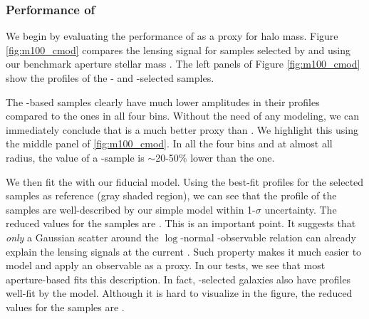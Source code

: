\documentclass[fleqn,usenatbib,useAMS,english]{mnras}
\begin{document}
\subsubsection{Performance of \mcmodel{}}
    \label{sec:cmodel}


    We begin by evaluating the performance of \cmodel{} as a proxy for halo mass.
    Figure \ref{fig:m100_cmod} compares the lensing signal for samples selected by \mcmodel{} and
    using our benchmark aperture stellar mass .
    The left panels of Figure \ref{fig:m100_cmod} show the \rdsigma{} profiles of the \mcmodel{}-
    and -selected samples.

    The \mcmodel{}-based samples clearly have much lower amplitudes in their \dsigma{} profiles
    compared to the  ones in all four bins.
    Without the need of any modeling, we can immediately conclude that  is a much
    better \mvir{} proxy than \mcmodel{}.
    We highlight this using the middle panel of \ref{fig:m100_cmod}.
    In all the four bins and at almost all radius, the \dsigma{} value of a \mcmodel{}-sample
    is $\sim$20-50\% lower than the  one.

    We then fit the \dsigma{} with our fiducial model.
    Using the best-fit profiles for the  selected samples as reference (gray shaded
    region), we can see that the \dsigma{} profile of the  samples are well-described
    by our simple model within 1-$\sigma$ uncertainty. The reduced \chisq{} values for the
    \maper{} samples are \todo{[XX, XX, XX, XX]}.
    This is an important point. It suggests that \emph{only} a Gaussian scatter around the
    $\log$-normal \mvir{}-observable relation can already explain the lensing signals at the
    current \snratio{}.
    Such property makes it much easier to model and apply an observable as a \mvir{} proxy.
    In our tests, we see that most aperture-based \mstar{} fits this description.
    In fact, \cmodel{}-selected galaxies also have \dsigma{} profiles well-fit by the model.
    Although it is hard to visualize in the figure, the reduced \chisq{} values for the
    \mcmodel{} samples are \todo{[XX, XX, XX, XX]}.
\end{document}
